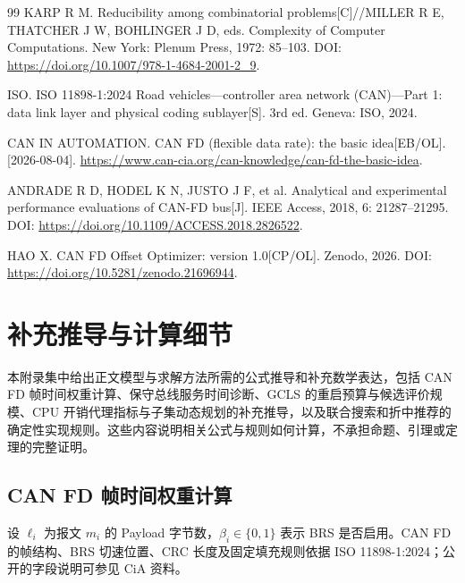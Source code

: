 \documentclass[UTF8,a4paper,twoside,zihao=-4]{ctexart}
\numberwithin{equation}{section}
\numberwithin{figure}{section}
\numberwithin{table}{section}
\theoremstyle{definition}
\numberwithin{algocf}{section}
\begin{document}
\begin{thebibliography}{99}
KARP R M. Reducibility among combinatorial problems[C]//MILLER R E, THATCHER J W, BOHLINGER J D, eds. Complexity of Computer Computations. New York: Plenum Press, 1972: 85--103. DOI: \url{https://doi.org/10.1007/978-1-4684-2001-2_9}.

ISO. ISO 11898-1:2024 Road vehicles---controller area network (CAN)---Part 1: data link layer and physical coding sublayer[S]. 3rd ed. Geneva: ISO, 2024.

CAN IN AUTOMATION. CAN FD (flexible data rate): the basic idea[EB/OL]. [2026-08-04]. \url{https://www.can-cia.org/can-knowledge/can-fd-the-basic-idea}.

ANDRADE R D, HODEL K N, JUSTO J F, et al. Analytical and experimental performance evaluations of CAN-FD bus[J]. IEEE Access, 2018, 6: 21287--21295. DOI: \url{https://doi.org/10.1109/ACCESS.2018.2826522}.

HAO X. CAN FD Offset Optimizer: version 1.0[CP/OL]. Zenodo, 2026. DOI: \url{https://doi.org/10.5281/zenodo.21696944}.

\end{thebibliography}

\clearpage
\appendix
{}

\clearpage
\section{补充推导与计算细节}
\label{sec:appendix-supplementary}

本附录集中给出正文模型与求解方法所需的公式推导和补充数学表达，包括 CAN FD 帧时间权重计算、保守总线服务时间诊断、GCLS 的重启预算与候选评价规模、CPU 开销代理指标与子集动态规划的补充推导，以及联合搜索和折中推荐的确定性实现规则。这些内容说明相关公式与规则如何计算，不承担命题、引理或定理的完整证明。

\subsection{CAN FD 帧时间权重计算}
\label{subsec:appendix-canfd-frame-time}

设 $\ell_i$ 为报文 $m_i$ 的 Payload 字节数，$\beta_i\in\{0,1\}$ 表示 BRS 是否启用。CAN FD 的帧结构、BRS 切速位置、CRC 长度及固定填充规则依据 ISO 11898-1:2024\cite{iso11898_2024}；公开的字段说明可参见 CiA 资料\cite{cia_canfd}。
\end{document}

